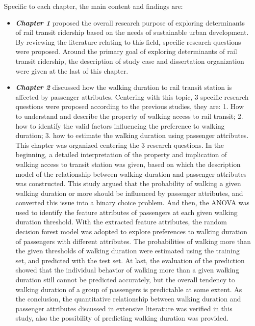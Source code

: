 Specific to each chapter, the main content and findings are:
\begin{itemize}
	\item \emph{\textbf{Chapter 1}} proposed the overall research purpose of exploring determinants of rail transit ridership based on the needs of sustainable urban development. By reviewing the literature relating to this field, specific research questions were proposed. Around the primary goal of exploring determinants of rail transit ridership, the description of study case and dissertation organization were given at the last of this chapter.
	
	
	\item \emph{\textbf{Chapter 2}} discussed how the walking duration to rail transit station is affected by passenger attributes. Centering with this topic, 3 specific research questions were proposed according to the previous studies, they are: 1. How to understand and describe the property of walking access to rail transit; 2. how to identify the valid factors influencing the preference to walking duration; 3. how to estimate the walking duration using passenger attributes. This chapter was organized centering the 3 research questions. In the beginning, a detailed interpretation of the property and implication of walking access to transit station was given, based on which the description model of the relationship between walking duration and passenger attributes was constructed. This study argued that the probability of walking a given walking duration or more should be influenced by passenger attributes, and converted this issue into a binary choice problem. And then, the ANOVA was used to identify the feature attributes of passengers at each given walking duration threshold. With the extracted feature attributes, the random decision forest model was adopted to explore preferences to walking duration of passengers with different attributes. The probabilities of walking more than the given thresholds of walking duration were estimated using the training set, and predicted with the test set. At last, the evaluation of the prediction showed that the individual behavior of walking more than a given walking duration still cannot be predicted accurately, but the overall tendency to walking duration of a group of passengers is predictable at some extent. As the conclusion, the quantitative relationship between walking duration and passenger attributes discussed in extensive literature was verified in this study, also the possibility of predicting walking duration was provided.
	

\end{itemize}
